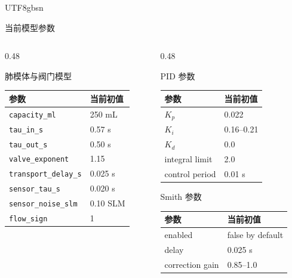\documentclass[aspectratio=169,10pt]{beamer}
\newcommand{\code}[1]{\texttt{\small #1}}
\begin{document}
\begin{CJK*}{UTF8}{gbsn}
\begin{frame}{当前模型参数}
  \begin{columns}[T,onlytextwidth]
    \begin{column}{0.48\textwidth}
      \begin{block}{肺模体与阀门模型}
        \begin{tabular}{ll}
          \toprule
          参数 & 当前初值 \\
          \midrule
          \code{capacity\_ml} & 250 mL \\
          \code{tau\_in\_s} & 0.57 s \\
          \code{tau\_out\_s} & 0.50 s \\
          \code{valve\_exponent} & 1.15 \\
          \code{transport\_delay\_s} & 0.025 s \\
          \code{sensor\_tau\_s} & 0.020 s \\
          \code{sensor\_noise\_slm} & 0.10 SLM \\
          \code{flow\_sign} & 1 \\
          \bottomrule
        \end{tabular}
      \end{block}
    \end{column}
    \begin{column}{0.48\textwidth}
      \begin{block}{PID 参数}
        \begin{tabular}{ll}
          \toprule
          参数 & 当前初值 \\
          \midrule
          $K_p$ & 0.022 \\
          $K_i$ & 0.16--0.21 \\
          $K_d$ & 0.0 \\
          integral limit & 2.0 \\
          control period & 0.01 s \\
          \bottomrule
        \end{tabular}
      \end{block}

      \begin{block}{Smith 参数}
        \begin{tabular}{ll}
          \toprule
          参数 & 当前初值 \\
          \midrule
          enabled & false by default \\
          delay & 0.025 s \\
          correction gain & 0.85--1.0 \\
          \bottomrule
        \end{tabular}
      \end{block}
    \end{column}
  \end{columns}


\end{frame}
\end{CJK*}
\end{document}
